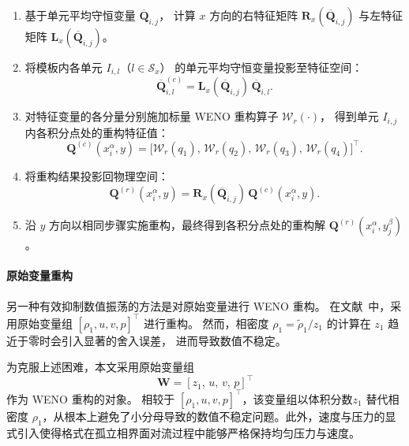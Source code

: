 \documentclass[12pt,a4paper]{article}
\numberwithin{equation}{section}    %
\begin{document}
\begin{enumerate}
    \item 基于单元平均守恒变量 $\overline{\bm{Q}}_{i,j}$，
          计算 $x$ 方向的右特征矩阵 $\bm{R}_x(\overline{\bm{Q}}_{i,j})$
          与左特征矩阵 $\bm{L}_x(\overline{\bm{Q}}_{i,j})$。

    \item 将模板内各单元 $I_{i,l}$（$l \in \mathcal{S}_x$）
          的单元平均守恒变量投影至特征空间：
          \begin{equation}
              \overline{\bm{Q}}_{i,l}^{(c)}
              = \bm{L}_x(\overline{\bm{Q}}_{i,j})\,\overline{\bm{Q}}_{i,l}.
          \end{equation}

    \item 对特征变量的各分量分别施加标量 WENO 重构算子
          $\mathcal{W}_r(\cdot)$，
          得到单元 $I_{i,j}$ 内各积分点处的重构特征值：
          \begin{equation}
              \bm{Q}^{(c)}(x_i^\alpha, y)
              = \bigl[\mathcal{W}_r(q_1),\,\mathcal{W}_r(q_2),\,
              \mathcal{W}_r(q_3),\,\mathcal{W}_r(q_4)\bigr]^\top.
          \end{equation}

    \item 将重构结果投影回物理空间：
          \begin{equation}
              \bm{Q}^{(r)}(x_i^\alpha, y)
              = \bm{R}_x(\overline{\bm{Q}}_{i,j})\,\bm{Q}^{(c)}(x_i^\alpha, y).
          \end{equation}

    \item 沿 $y$ 方向以相同步骤实施重构，最终得到各积分点处的重构解
          $\bm{Q}^{(r)}(x_i^\alpha, y_j^\beta)$。
\end{enumerate}

\paragraph{原始变量重构}
另一种有效抑制数值振荡的方法是对原始变量进行 WENO 重构。
在文献~\cite{li2022simplified}中，采用原始变量组
$[\rho_1, u, v, p]^\top$ 进行重构。
然而，相密度 $\rho_1 = \tilde{\rho}_1 / z_1$
的计算在 $z_1$ 趋近于零时会引入显著的舍入误差，
进而导致数值不稳定。

为克服上述困难，本文采用原始变量组
\begin{equation}
    \bm{W} = [z_1,\, u,\, v,\, p]^\top
\end{equation}
作为 WENO 重构的对象。
相较于 $[\rho_1, u, v, p]^\top$，该变量组以体积分数$z_1$ 替代相密度 $\rho_1$，从根本上避免了小分母导致的数值不稳定问题。此外，速度与压力的显式引入使得格式在孤立相界面对流过程中能够严格保持均匀压力与速度。
\end{document}
